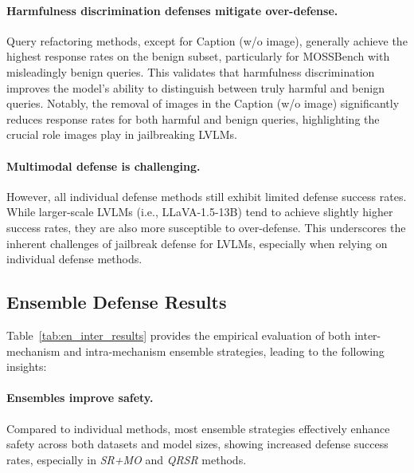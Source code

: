 \paragraph{Harmfulness discrimination defenses mitigate over-defense.} Query refactoring methods, except for Caption (w/o image), generally achieve the highest response rates on the benign subset, particularly for MOSSBench with misleadingly benign queries. This validates that harmfulness discrimination improves the model's ability to distinguish between truly harmful and benign queries. Notably, the removal of images in the Caption (w/o image) significantly reduces response rates for both harmful and benign queries, highlighting the crucial role images play in jailbreaking LVLMs.

\paragraph{Multimodal defense is challenging.}
However, all individual defense methods still exhibit limited defense success rates. While larger-scale LVLMs (i.e., LLaVA-1.5-13B) tend to achieve slightly higher success rates, they are also more susceptible to over-defense. This underscores the inherent challenges of jailbreak defense for LVLMs, especially when relying on individual defense methods. 

\subsection{Ensemble Defense Results}
Table~\ref{tab:en_inter_results} provides the empirical evaluation of both inter-mechanism and intra-mechanism ensemble strategies, leading to the following insights:

\paragraph{Ensembles improve safety.} Compared to individual methods, most ensemble strategies effectively enhance safety across both datasets and model sizes, showing increased defense success rates, especially in \textit{SR+MO} and \textit{QR\textbar{}SR} methods.

